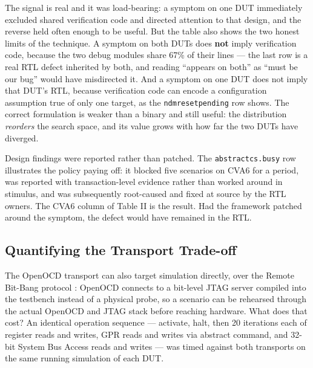 \documentclass[conference]{IEEEtran}
\begin{document}
The signal is real and it was load-bearing: a symptom on one DUT immediately excluded shared verification code and directed attention to that design, and the reverse held often enough to be useful. But the table also shows the two honest limits of the technique. A symptom on both DUTs does \textbf{not} imply verification code, because the two debug modules share 67\% of their lines --- the last row is a real RTL defect inherited by both, and reading ``appears on both'' as ``must be our bug'' would have misdirected it. And a symptom on one DUT does not imply that DUT's RTL, because verification code can encode a configuration assumption true of only one target, as the \texttt{ndmresetpending} row shows. The correct formulation is weaker than a binary and still useful: the distribution \textit{reorders} the search space, and its value grows with how far the two DUTs have diverged.

Design findings were reported rather than patched. The \texttt{abstractcs.busy} row illustrates the policy paying off: it blocked five scenarios on CVA6 for a period, was reported with transaction-level evidence rather than worked around in stimulus, and was subsequently root-caused and fixed at source by the RTL owners. The CVA6 column of Table II is the result. Had the framework patched around the symptom, the defect would have remained in the RTL.

\subsection{Quantifying the Transport Trade-off}
The OpenOCD transport can also target simulation directly, over the Remote Bit-Bang protocol \cite{b7}: OpenOCD connects to a bit-level JTAG server compiled into the testbench instead of a physical probe, so a scenario can be rehearsed through the actual OpenOCD and JTAG stack before reaching hardware. What does that cost? An identical operation sequence --- activate, halt, then 20 iterations each of register reads and writes, GPR reads and writes via abstract command, and 32-bit System Bus Access reads and writes --- was timed against both transports on the same running simulation of each DUT.
\end{document}
